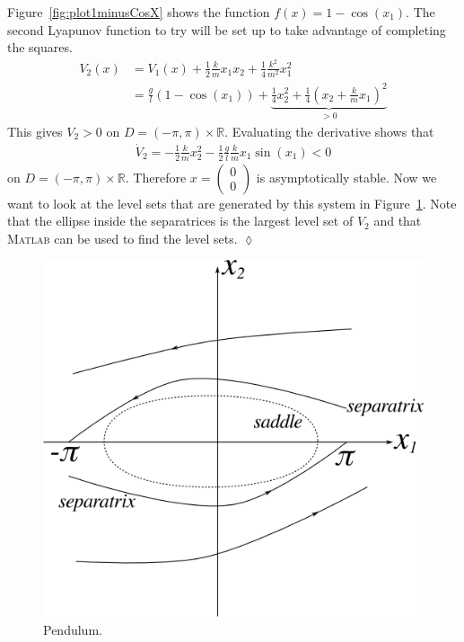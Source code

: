 \begin{example}
Figure~\ref{fig:plot1minusCosX} shows the function $f(x) = 1-\cos(x_1)$.
The second Lyapunov function to try will be set up to take advantage of completing the squares.
\begin{align*}
V_2(x) &= V_1(x) + \tfrac{1}{2}\tfrac{k}{m}x_1x_2 + \tfrac{1}{4}\tfrac{k^2}{m^2}x_1^2 \\
       &= \tfrac{g}{l}(1-\cos(x_1)) + \underbrace{\tfrac{1}{4}x_2^2 + \tfrac{1}{4}{(x_2+\tfrac{k}{m}x_1)}^2}_{>0}
\end{align*}
This gives $V_2>0$ on $D=(-\pi,\pi)\times\mathbb{R}$.
Evaluating the derivative shows that
\begin{align*}
\dot{V}_2 = -\tfrac{1}{2}\tfrac{k}{m}x_2^2 - \tfrac{1}{2}\tfrac{g}{l}\tfrac{k}{m}x_1\sin(x_1) < 0
\end{align*}
on $D=(-\pi,\pi)\times\mathbb{R}$.
Therefore $x=\left(\begin{array}{c} 0 \\ 0 \end{array}\right)$ is asymptotically stable.
Now we want to look at the level sets that are generated by this system in Figure~\ref{fig:09separatrix}.
Note that the ellipse inside the separatrices is the largest level set of $V_2$ and that \textsc{Matlab} can be used to find the level sets.
$\lozenge$
\end{example}

\begin{figure}[ht!]
\centering
\includegraphics[width=.5\textwidth]{images/09separatrix}
\caption{Pendulum.}
\label{fig:09separatrix}
\end{figure}

